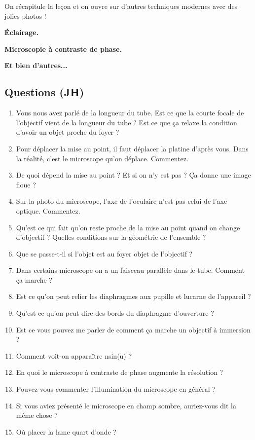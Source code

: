On récapitule la leçon et on ouvre sur d'autres techniques modernes avec des jolies photos !

\begin{slide}
\textbf{Éclairage.}
\end{slide}

\begin{slide}
\textbf{Microscopie à contraste de phase.}
\end{slide}

\begin{slide}
\textbf{Et bien d'autres...}
\end{slide}

\subsection*{Questions (JH)}

\begin{enumerate}
\item Vous nous avez parlé de la longueur du tube. Est ce que la courte focale de l'objectif vient de la longueur du tube ? Est ce que ça relaxe la condition d'avoir un objet proche du foyer ?
\item Pour déplacer la mise au point, il faut déplacer la platine d'après vous. Dans la réalité, c'est le microscope qu'on déplace. Commentez.
\item De quoi dépend la mise au point ? Et si on n'y est pas ? Ça donne une image floue ?
\item Sur la photo du microscope, l'axe de l'oculaire n'est pas celui de l'axe optique. Commentez.
\item Qu'est ce qui fait qu'on reste proche de la mise au point quand on change d'objectif ? Quelles conditions sur la géométrie de l'ensemble ?
\item Que se passe-t-il si l'objet est au foyer objet de l'objectif ?
\item Dans certains microscope on a un faisceau parallèle dans le tube. Comment ça marche ?
\item Est ce qu'on peut relier les diaphragmes aux pupille et lucarne de l'appareil ?
\item Qu'est ce qu'on peut dire des bords du diaphragme d'ouverture ?
\item Est ce vous pouvez me parler de comment ça marche un objectif à immersion ?
\item Comment voit-on apparaître nsin(u) ?
\item En quoi le microscope à contraste de phase augmente la résolution ?
\item Pouvez-vous commenter l'illumination du microscope en général ?
\item Si vous aviez présenté le microscope en champ sombre, auriez-vous dit la même chose ?
\item Où placer la lame quart d'onde ?
\end{enumerate}

\newpage